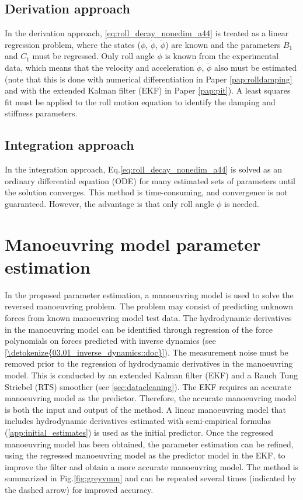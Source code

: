 \subsection{Derivation approach}\label{sec:derivation_approach}
In the derivation approach, \autoref{eq:roll_decay_nonedim_a44} is treated as a linear regression problem, where the states ($\phi$, $\dot{\phi}$, $\ddot{\phi}$) are known and the parameters $B_1$ and $C_1$ must be regressed. Only roll angle $\phi$ is known from the experimental data, which means that the velocity and acceleration $\dot{\phi}$, $\ddot{\phi}$ also must be estimated (note that this is done with numerical differentiation in Paper \ref{pap:rolldamping} and with the extended Kalman filter (EKF) in Paper \ref{pap:pit}).
A least squares fit must be applied to the roll motion equation to identify the damping and stiffness parameters.

\subsection{Integration approach}\label{sec:integration_approach}
In the integration approach, Eq.\ref{eq:roll_decay_nonedim_a44} is solved as an ordinary differential equation (ODE) for many estimated sets of parameters until the solution converges. This method is time-consuming, and convergence is not guaranteed. However, the advantage is that only roll angle $\phi$ is needed.

\section{Manoeuvring model parameter estimation} \label{sec:_VMM}
In the proposed parameter estimation, a manoeuvring model is used to solve the reversed manoeuvring problem. The problem may consist of predicting unknown forces from known manoeuvring model test data. The hydrodynamic derivatives in the manoeuvring model can be identified through regression of the force polynomials on forces predicted with inverse dynamics (see \autoref{\detokenize{03.01_inverse_dynamics::doc}}).
The measurement noise must be removed prior to the regression of hydrodynamic derivatives in the manoeuvring model. This is conducted by an extended Kalman filter (EKF) and a Rauch Tung Striebel (RTS) smoother (see \autoref{sec:datacleaning}). The EKF requires an accurate manoeuvring model as the predictor.
Therefore, the accurate manoeuvring model is both the input and output of the method. A linear manoeuvring model that includes hydrodynamic derivatives estimated with semi-empirical formulas (\autoref{app:initial_estimates}) is used as the initial predictor. Once the regressed manoeuvring model has been obtained, the parameter estimation can be refined, using the regressed manoeuvring model as the predictor model in the EKF, to improve the filter and obtain a more accurate manoeuvring model. The method is summarized in Fig.\ref{fig:greyvmm} and can be repeated several times (indicated by the dashed arrow) for improved accuracy. 

